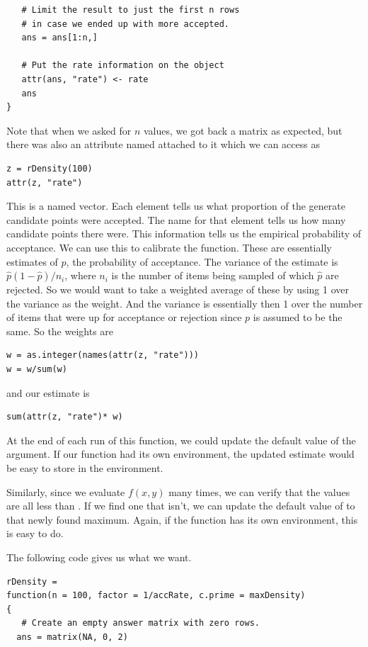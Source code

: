 \documentclass{article}
\begin{document}
\begin{description}
\begin{verbatim}
   # Limit the result to just the first n rows
   # in case we ended up with more accepted.
   ans = ans[1:n,]

   # Put the rate information on the object
   attr(ans, "rate") <- rate
   ans
}

\end{verbatim}


Note that when we asked for $n$ values, we got back 
a matrix as expected, but there was also an attribute
named  attached to it which we can access
as 
\begin{verbatim}
z = rDensity(100)
attr(z, "rate")
\end{verbatim}
This is a named vector.  Each element tells us what proportion of the
generate candidate points were accepted.  The name for that element
tells us how many candidate points there were.  This information tells
us the empirical probability of acceptance.  We can use this to
calibrate the function.  These are essentially estimates of $p$, the
probability of acceptance.  The variance of the estimate is $ \hat{p}
(1 - \hat{p})/n_i$, where $n_i$ is the number of items being sampled
of which $\hat{p}$ are rejected.  So we would want to take a weighted
average of these by using 1 over the variance as the weight.  And the
variance is essentially then 1 over the number of items that were up
for acceptance or rejection since $p$ is assumed to be the same.  So
the weights are 
\begin{verbatim}
w = as.integer(names(attr(z, "rate")))
w = w/sum(w)
\end{verbatim}
and our estimate is 
\begin{verbatim}
sum(attr(z, "rate")* w)
\end{verbatim}

At the end of each run of this function, we could update the default
value of the  argument.  If our function had its own
environment, the updated estimate would be easy to store in the
environment.

Similarly, since we evaluate $f(x, y)$ many times, we can verify that
the values are all less than .  If we find one that
isn't, we can update the default value of  to that newly
found maximum.  Again, if the function has its own environment, this
is easy to do.

The following code gives us what we want.
\begin{verbatim}
rDensity =
function(n = 100, factor = 1/accRate, c.prime = maxDensity)
{
   # Create an empty answer matrix with zero rows.
  ans = matrix(NA, 0, 2)


\end{verbatim}
\end{description}
\end{document}
